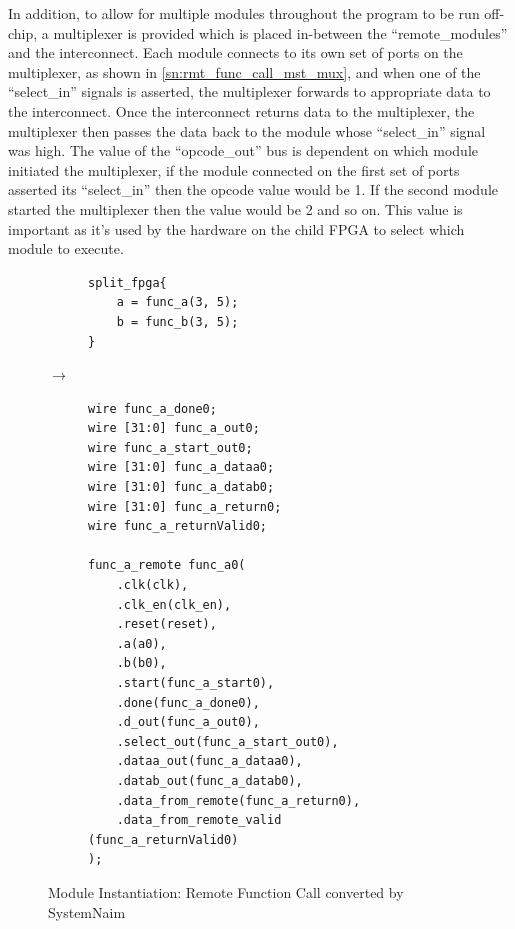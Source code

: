 In addition, to allow for multiple modules throughout the program to be run off-chip, a multiplexer is provided which is placed in-between the “remote\_modules” and the interconnect. Each module connects to its own set of ports on the multiplexer, as shown in \autoref{sn:rmt_func_call_mst_mux}, and when one of the “select\_in” signals is asserted, the multiplexer forwards to appropriate data to the interconnect. Once the interconnect returns data to the multiplexer, the multiplexer then passes the data back to the module whose “select\_in” signal was high. The value of the “opcode\_out” bus is dependent on which module initiated the multiplexer, if the module connected on the first set of ports asserted its “select\_in” then the opcode value would be 1. If the second module started the multiplexer then the value would be 2 and so on. This value is important as it's used by the hardware on the child FPGA to select which module to execute.

\begin{figure}[H]
\centering
\begin{subfigure}{0.32\textwidth}
    \centering
    \begin{verbatim}
split_fpga{
    a = func_a(3, 5);
    b = func_b(3, 5);
}
\end{verbatim}
\end{subfigure}%
{\LARGE$\rightarrow$}%
\begin{subfigure}{0.58\textwidth}
    \begin{verbatim}
wire func_a_done0;
wire [31:0] func_a_out0;
wire func_a_start_out0;
wire [31:0] func_a_dataa0;
wire [31:0] func_a_datab0;
wire [31:0] func_a_return0;
wire func_a_returnValid0;

func_a_remote func_a0(
    .clk(clk),
    .clk_en(clk_en),
    .reset(reset),
    .a(a0),
    .b(b0),
    .start(func_a_start0),
    .done(func_a_done0),
    .d_out(func_a_out0),
    .select_out(func_a_start_out0),
    .dataa_out(func_a_dataa0),
    .datab_out(func_a_datab0),
    .data_from_remote(func_a_return0),
    .data_from_remote_valid (func_a_returnValid0)
);
    \end{verbatim}
\end{subfigure}
\caption{Module Instantiation: Remote Function Call converted by SystemNaim}
\label{sn:rmt_func_call_mdl}
\end{figure}

